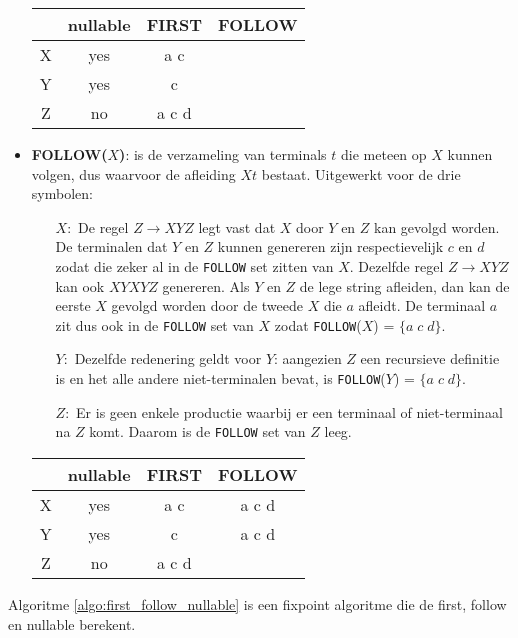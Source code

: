 \begin{itemize}
	\begin{table}[h]
	\centering
	\begin{tabular}{c | c c c}
			& nullable & FIRST & FOLLOW \\
			\hline
			X & yes & a c & \\
			Y & yes & c & \\
			Z & no & a c d & 
		\end{tabular}
	\end{table}
	
	\item \textbf{FOLLOW($X$)}: is de verzameling van terminals $t$ die meteen op $X$ kunnen volgen, dus waarvoor de afleiding $Xt$ bestaat. 
	Uitgewerkt voor de drie symbolen:
	\begin{itemize}
		\item[$X:$]  De regel $Z \rightarrow X Y Z$ legt vast dat $X$ door $Y$ en $Z$ kan gevolgd worden. De terminalen dat $Y$ en $Z$ kunnen genereren zijn respectievelijk $c$ en $d$ zodat die zeker al in de \texttt{FOLLOW} set zitten van $X$. Dezelfde regel $Z \rightarrow X Y Z$ kan ook $X Y X Y Z$ genereren. 
		Als $Y$ en $Z$ de lege string afleiden, dan kan de eerste $X$ gevolgd worden door de tweede $X$ die $a$ afleidt. De terminaal $a$ zit dus ook in de \texttt{FOLLOW} set van $X$ zodat \texttt{FOLLOW}($X$) = $\{a\;c\;d\}$.
		
		
		\item[$Y:$] Dezelfde redenering geldt voor $Y$: aangezien $Z$ een recursieve definitie is en het alle andere niet-terminalen bevat, is \texttt{FOLLOW}($Y$) = $\{a\;c\;d\}$. 
		\item[$Z:$] Er is geen enkele productie waarbij er een terminaal of niet-terminaal na $Z$ komt. Daarom is de \texttt{FOLLOW} set van $Z$ leeg.
	\end{itemize}
	\begin{table}[h]
		\centering
		\begin{tabular}{c | c c c}
			& nullable & FIRST & FOLLOW \\
			\hline
			X & yes & a c & a c d\\
			Y & yes & c & a c d\\
			Z & no & a c d & 
		\end{tabular}
	\end{table}
\end{itemize}

Algoritme \ref{algo:first_follow_nullable} is een fixpoint algoritme die de first, follow en nullable berekent.

